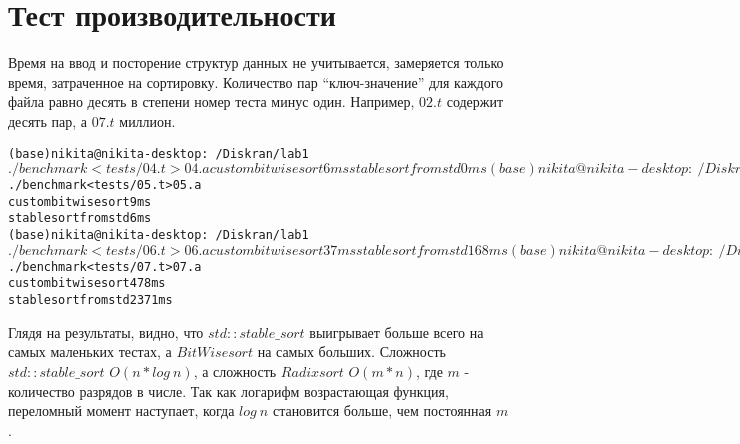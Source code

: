 \section{Тест производительности}
Время на ввод и посторение структур данных не учитывается, замеряется только время, затраченное на сортировку. Количество пар \enquote{ключ-значение} для каждого файла равно десять в степени номер теста минус один. Например, $02.t$ содержит десять пар, а $07.t$ миллион.

\begin{alltt}
(base) nikita@nikita-desktop:~/Diskran/lab1$ ./benchmark < tests/04.t > 04.a
custom bitwise sort 6 ms
stable sort from std 0 ms
(base) nikita@nikita-desktop:~/Diskran/lab1$ ./benchmark < tests/05.t > 05.a
custom bitwise sort 9 ms
stable sort from std 6 ms
(base) nikita@nikita-desktop:~/Diskran/lab1$ ./benchmark < tests/06.t > 06.a
custom bitwise sort 37 ms
stable sort from std 168 ms
(base) nikita@nikita-desktop:~/Diskran/lab1$ ./benchmark < tests/07.t > 07.a
custom bitwise sort 478 ms
stable sort from std 2371 ms
    
\end{alltt}

Глядя на результаты, видно, что $std::stable\_sort$ выигрывает больше всего на самых маленьких тестах, а $BitWise sort$ на самых больших. Сложность $std::stable\_sort$ $O(n * log\ n)$, а сложность $Radix sort$ $O(m * n)$, где $m$ - количество разрядов в числе. Так как логарифм возрастающая функция, переломный момент наступает, когда $log\ n$ становится больше, чем постоянная $m$.

\pagebreak

